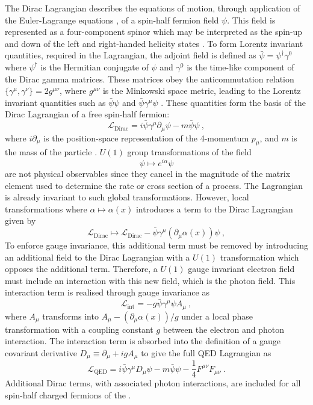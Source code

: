 The Dirac Lagrangian describes the equations of motion, through application of the Euler-Lagrange equations \cite{Troutman1983}, of a spin-half fermion field $\psi$. This field is represented as a four-component spinor which may be interpreted as the spin-up and down of the left and right-handed helicity states \cite{Peskin:1995ev}. To form Lorentz invariant quantities, required in the Lagrangian, the adjoint field is defined as $\bar{\psi}=\psi^{\dagger}\gamma^0$ where $\psi^{\dagger}$ is the Hermitian conjugate of $\psi$ and $\gamma^0$ is the time-like component of the Dirac gamma matrices. These matrices obey the anticommutation relation $\{\gamma^{\mu},\gamma^{\nu}\} = 2g^{\mu\nu}$, where $g^{\mu\nu}$ is the Minkowski space metric, leading to the Lorentz invariant quantities such as $\bar{\psi}\psi$ and $\bar{\psi}\gamma^{\mu}\psi$ \cite{Peskin:1995ev}. These quantities form the basis of the Dirac Lagrangian of a free spin-half fermion:
%
\begin{equation}
    \mathcal{L}_{\mathrm{Dirac}} = i\bar{\psi}\gamma^{\mu}\partial_{\mu}\psi - m\bar{\psi}\psi\ ,
\end{equation}
%
where $i\partial_{\mu}$ is the position-space representation of the 4-momentum $p_\mu$, and $m$ is the mass of the particle \cite{1928RSPSA.117..610D}.  $U(1)$ group transformations of the field
%
\begin{equation}
    \psi \mapsto e^{i\alpha}\psi
\end{equation}
%
are not physical observables since they cancel in the magnitude of the matrix element used to determine the rate or cross section of a process. The Lagrangian is already invariant to such global transformations. However, local transformations where $\alpha\mapsto\alpha(x)$ introduces a term to the Dirac Lagrangian given by
%
\begin{equation}
    \mathcal{L}_{\mathrm{Dirac}} \mapsto \mathcal{L}_{\mathrm{Dirac}}  - \bar{\psi}\gamma^{\mu}(\partial_\mu\alpha(x))\psi\ ,
\end{equation}
%
To enforce gauge invariance, this additional term must be removed by introducing an additional field to the Dirac Lagrangian with a $U(1)$ transformation which opposes the additional term. Therefore, a $U(1)$ gauge invariant electron field must include an interaction with this new field, which is the photon field. This interaction term is realised through gauge invariance as
%
\begin{equation}
    \mathcal{L}_{\mathrm{int}} = -g\bar{\psi}\gamma^{\mu}\psi A_{\mu}\ ,
\end{equation}
%
where $A_\mu$ transforms into $A_\mu - (\partial_\mu\alpha(x))/g$ under a local phase transformation with a coupling constant $g$ between the electron and photon interaction. The interaction term is absorbed into the definition of a gauge covariant derivative $D_{\mu} \equiv \partial_\mu +igA_\mu$ to give the full QED Lagrangian as
%
\begin{equation}
    \mathcal{L}_{\mathrm{QED}} = i\bar{\psi}\gamma^{\mu}D_{\mu}\psi - m \bar{\psi}\psi - \frac{1}{4}F^{\mu\nu}F_{\mu\nu}\ .
\end{equation}
%
Additional Dirac terms, with associated photon interactions, are included for all spin-half charged fermions of the \SM.



